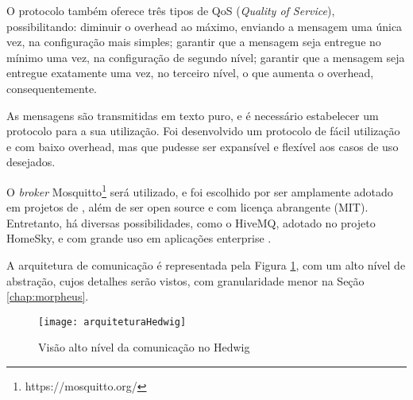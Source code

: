 O protocolo \wmqtt{} também oferece três tipos de QoS (\textit{Quality of Service}), possibilitando: diminuir o overhead ao máximo, enviando a mensagem uma única vez, na configuração mais simples; garantir que a mensagem seja entregue no mínimo uma vez, na configuração de segundo nível; garantir que a mensagem seja entregue exatamente uma vez, no terceiro nível, o que aumenta o overhead, consequentemente.

As mensagens são transmitidas em texto puro, e é necessário estabelecer um protocolo para a sua utilização. Foi desenvolvido um protocolo de fácil utilização e com baixo overhead, mas que pudesse ser expansível e flexível aos casos de uso desejados.

O \textit{broker} Mosquitto\footnote{https://mosquitto.org/} será utilizado, e foi escolhido por ser amplamente adotado em projetos de \wiot{}, além de ser open source e com licença abrangente (MIT). Entretanto, há diversas possibilidades, como o HiveMQ, adotado no projeto HomeSky, e com grande uso em aplicações enterprise \cite{hiveMq}.

A arquitetura de comunicação é representada pela Figura \ref{fig:diagramaComunicacao}, com um alto nível de abstração, cujos detalhes serão vistos, com granularidade menor na Seção \ref{chap:morpheus}.

\begin{figure}[H]
	\centering
	\caption{Visão alto nível da comunicação no Hedwig}
  \texttt{[image: arquiteturaHedwig]}
\label{fig:diagramaComunicacao}
\end{figure}


